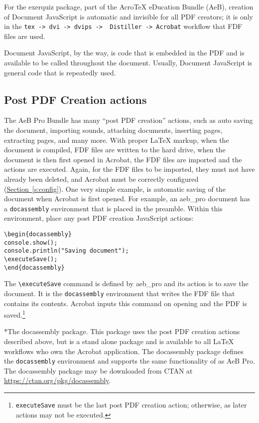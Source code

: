 \documentclass{article}
\makeatletter
\let\env\texttt
\def\cs#1{\texttt{\eqbs#1}}
\renewcommand{\paragraph}
    {\@startsection{paragraph}{4}{0pt}{6pt}{-3pt}
    {\normalfont\normalsize\bfseries}}
\def\AEBP{\app{AeB Pro}}
\def\AEB{\app{AeB}}
\let\app\textsf
\let\pkg\textsf
\makeatother
\begin{document}
For the \pkg{exerquiz} package, part of the {Acro\!\TeX} eDucation Bundle
(\AEB), creation of Document JavaScript is automatic and invisible for all
PDF creators; it is only in the
\texttt{tex\,->\,dvi\,->\,\app{dvips}\,->\,\ignorespaces
\app{Distiller}\,->\,\app{Acrobat}} workflow that FDF files are used.

Document JavaScript, by the way, is code that is embedded in the PDF and is
available to be called throughout the document. Usually, Document JavaScript
is general code that is repeatedly used.


\subsection{Post PDF Creation actions}

The {\AEBP} Bundle has many ``post PDF creation'' actions, such as auto
saving the document, importing sounds, attaching documents, inserting pages,
extracting pages, and many more. With proper {\LaTeX} markup, when the
document is compiled, FDF files are written to the hard drive, when the
document is then first opened in \app{Acrobat}, the FDF files are imported
and the actions are executed. Again, for the FDF files to be imported, they
must not have already been deleted, and \app{Acrobat} must be correctly
configured (\hyperref[s:config]{Section~\ref*{s:config}}). One very simple
example, is automatic saving of the document when \app{Acrobat} is first
opened. For example, an \pkg{aeb\_pro} document has a \env{docassembly}
environment that is placed in the preamble. Within this environment, place
any post PDF creation JavaScript actions:
\begin{Verbatim}[xleftmargin=\parindent]
\begin{docassembly}
console.show();
console.println("Saving document");
\executeSave();
\end{docassembly}
\end{Verbatim}
The \verb~\executeSave~ command is defined by \pkg{aeb\_pro} and its action
is to save the document. It is the \env{docassembly} environment that writes
the FDF file that contains its contents. \app{Acrobat} inputs this command on
opening and the PDF is saved.\footnote{\cs{executeSave} must be the last post PDF
creation action; otherwise, as later actions may not be executed.}

\paragraph*{The \pkg{docassembly} package.} This package uses the post PDF creation actions
described above, but is a stand alone package and is available to all {\LaTeX} workflows who own
the \app{Acrobat} application. The \pkg{docassembly} package defines the
\env{docassembly} environment and supports the same functionality of as {\AEBP}. The \pkg{docassembly}
package may be downloaded from CTAN at \url{https://ctan.org/pkg/docassembly}.
\end{document}
